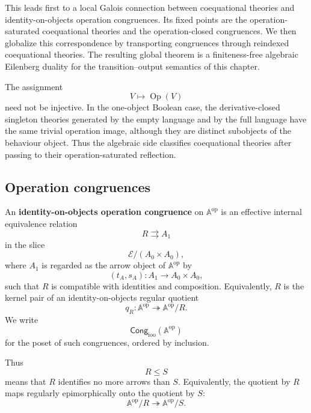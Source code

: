 This leads first to a local Galois connection between coequational theories and
identity-on-objects operation congruences. Its fixed points are the
operation-saturated coequational theories and the operation-closed congruences.
We then globalize this correspondence by transporting congruences through
reindexed coequational theories. The resulting global theorem is a
finiteness-free algebraic Eilenberg duality for the transition--output
semantics of this chapter.

\begin{remark}
\label{rem:operation-images-do-not-classify-all-theories}
    The assignment
    \[
        V\longmapsto \operatorname{Op}(V)
    \]
    need not be injective. In the one-object Boolean case, the
    derivative-closed singleton theories generated by the empty language and by
    the full language have the same trivial operation image, although they are
    distinct subobjects of the behaviour object. Thus the algebraic side
    classifies coequational theories after passing to their
    operation-saturated reflection.
\end{remark}

\subsection{Operation congruences}
\label{subsec:eilenberg-operation-congruences}

\begin{definition}
\label{def:identity-on-objects-operation-congruence}
    An \textbf{identity-on-objects operation congruence} on
    \(\mathbb A^{\mathrm{op}}\) is an effective internal equivalence relation
    \[
        R\rightrightarrows A_1
    \]
    in the slice
    \[
        \mathcal E/(A_0\times A_0),
    \]
    where \(A_1\) is regarded as the arrow object of
    \(\mathbb A^{\mathrm{op}}\) by
    \[
        (t_A,s_A):A_1\to A_0\times A_0,
    \]
    such that \(R\) is compatible with identities and composition. Equivalently,
    \(R\) is the kernel pair of an identity-on-objects regular quotient
    \[
        q_R:\mathbb A^{\mathrm{op}}\twoheadrightarrow
        \mathbb A^{\mathrm{op}}/R.
    \]
    We write
    \[
        \mathsf{Cong}_{\mathrm{ioo}}(\mathbb A^{\mathrm{op}})
    \]
    for the poset of such congruences, ordered by inclusion.
\end{definition}

Thus
\[
    R\leq S
\]
means that \(R\) identifies no more arrows than \(S\). Equivalently, the
quotient by \(R\) maps regularly epimorphically onto the quotient by \(S\):
\[
    \mathbb A^{\mathrm{op}}/R
    \twoheadrightarrow
    \mathbb A^{\mathrm{op}}/S.
\]

